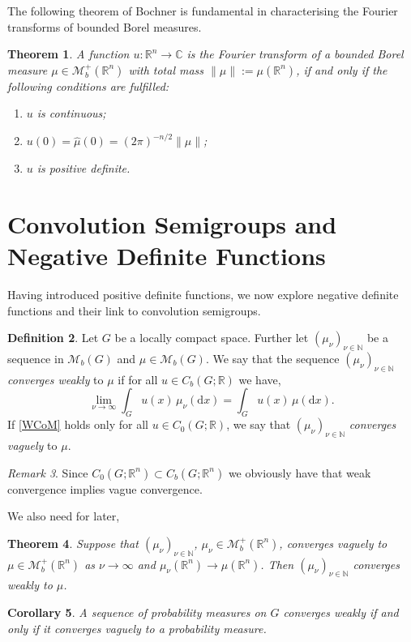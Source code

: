 \documentclass[a4paper, 12pt]{report}
\newtheorem{theorem}{Theorem}[section]
\newtheorem{cor}[theorem]{Corollary}
\theoremstyle{cor}
\theoremstyle{remark}
\newtheorem{remark}[theorem]{Remark}
\theoremstyle{definition}
\newtheorem{defn}[theorem]{Definition}
\begin{document}
The following theorem of Bochner is fundamental in characterising the Fourier transforms of bounded Borel measures.
\begin{theorem}
A function $u : \mathbb{R}^n \to \mathbb{C}$ is the Fourier transform of a bounded Borel measure $\mu \in \mathcal{M}_b^+(\mathbb{R}^n)$ with total mass $\|\mu\| := \mu(\mathbb{R}^n)$, if and only if the following conditions are fulfilled:
\begin{enumerate}
\item $u$ is continuous;

\item $u(0) = \hat{\mu}(0) = (2\pi)^{-n/2}\|\mu\|$;

\item $u$ is positive definite.
\end{enumerate}
\end{theorem}


\section{Convolution Semigroups and Negative Definite Functions}\label{Se.CSaNDF}

Having introduced positive definite functions, we now explore negative definite functions and their link to convolution semigroups.
\begin{defn}
Let $G$ be a locally compact space.  Further let $(\mu_\nu)_{\nu \in \mathbb{N}}$ be a sequence in $\mathcal{M}_b(G)$ and $\mu \in \mathcal{M}_b(G)$.  We say that the sequence $(\mu_\nu)_{\nu \in \mathbb{N}}$ \emph{converges weakly} to $\mu$ if for all $u \in C_b(G; \mathbb{R})$ we have,
\begin{equation}
\lim_{\nu \to \infty}\int_Gu(x)\,\mu_\nu(\mathrm{d}x) = \int_Gu(x)\,\mu(\mathrm{d}x).\label{WCoM}
\end{equation}
If \eqref{WCoM} holds only for all $u \in C_0(G; \mathbb{R})$, we say that $(\mu_\nu)_{\nu \in \mathbb{N}}$ \emph{converges vaguely} to $\mu$.
\end{defn}
\begin{remark}
Since $C_0(G; \mathbb{R}^n) \subset C_b(G; \mathbb{R}^n)$ we obviously have that weak convergence implies vague convergence.
\end{remark}

We also need for later,

\begin{theorem}\label{VCimpliesWC}
Suppose that $(\mu_\nu)_{\nu \in \mathbb{N}}$, $\mu_\nu \in \mathcal{M}_b^+(\mathbb{R}^n)$, converges vaguely to $\mu \in \mathcal{M}_b^+(\mathbb{R}^n)$ as $\nu \to \infty$ and $\mu_\nu(\mathbb{R}^n) \to \mu(\mathbb{R}^n)$.  Then $(\mu_\nu)_{\nu \in \mathbb{N}}$ converges weakly to $\mu$.
\end{theorem}
\begin{cor}
A sequence of probability measures on $G$ converges weakly if and only if it converges vaguely to a probability measure.
\end{cor}
\end{document}
